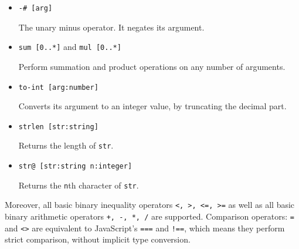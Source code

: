\begin{itemize}
    \item \texttt{-\# [arg]} 
    
    The unary minus operator. It negates its argument.
    
    \item \texttt{sum [0..*]} and \texttt{mul [0..*]}
    
    Perform summation and product operations on any number of arguments.
    \item \texttt{to-int [arg:number]} 
    
    Converts its argument to an integer value, by truncating the decimal part.
    
    \item \texttt{strlen [str:string]}
    
    Returns the length of \texttt{str}.
    \item \texttt{str@ [str:string n:integer]} 
    
    Returns the \texttt{n}th character of \texttt{str}.
\end{itemize}

Moreover, all basic binary inequality operators \texttt{<, >, <=, >=} as well as all basic binary arithmetic operators \texttt{+, -, *, /} are supported. Comparison operators: \texttt{=} and \texttt{<>} are equivalent to JavaScript's \texttt{===} and \texttt{!==}, which means they perform strict comparison, without implicit type conversion\cite[Section~Equality operators]{mdn_comparison_operators}.

